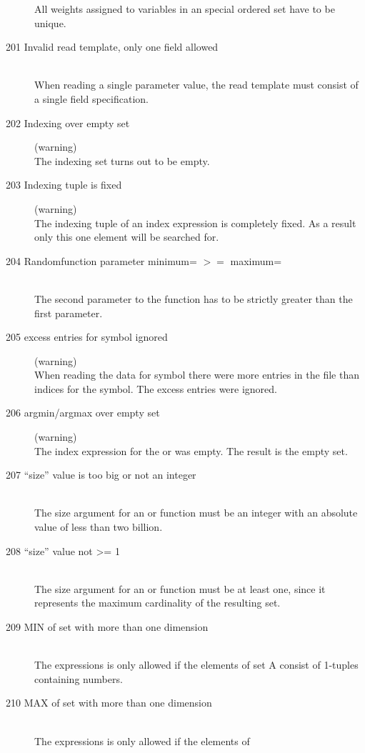 \begin{description}
  All weights assigned to variables in an special ordered set have to
  be unique. 
\item[201 Invalid read template, only one field allowed]\ \\
  When reading a single parameter value, the read template must
  consist of a single field specification.
\item[202 Indexing over empty set] (warning)\ \\
  The indexing set turns out to be empty.
\item[203 Indexing tuple is fixed] (warning)\ \\
  The indexing tuple of an index expression is completely fixed. As a
  result only this one element will be searched for.
\item[204 Randomfunction parameter minimum= \code{xxx} $>=$ maximum=
  \code{yyy}]\ \\
  The second parameter to the function  has to be
  strictly greater than the first parameter.
\item[205 \code{xxx} excess entries for symbol \code{yyy} ignored ]
  (warning)\ \\
  When reading the data for symbol  there were 
   more entries in the file than indices for the symbol.
  The excess entries were ignored.  
\item[206 argmin/argmax over empty set] (warning)\ \\
   The index expression for the  or  was
   empty. The result is the empty set.
\item[207 ``size'' value \code{xxx} is too big or not an integer]\ \\
   The size argument for an  or  function
   must be an integer with an absolute value of less than two billion.
\item[208 ``size'' value \code{xxx} not >= 1]\ \\
   The size argument for an  or  function
   must be at least one, since it represents the maximum cardinality
   of the resulting set.
\item[209 MIN of set with more than one dimension]\ \\
   The expressions  is only allowed if the elements of 
   set A consist of 1-tuples containing numbers.  
\item[210 MAX of set with more than one dimension]\ \\
   The expressions  is only allowed if the elements of 

\end{description}

